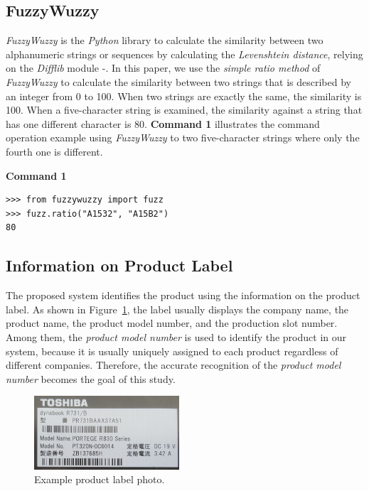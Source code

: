 \documentclass[technicalreport]{ieicej}
\begin{document}
    \subsection{FuzzyWuzzy}
        {\em FuzzyWuzzy} is the {\em Python} library to calculate the similarity between two alphanumeric strings or sequences by calculating the {\em Levenshtein distance}, relying on the {\em Difflib} module \cite{fuzzywuzzy}-\cite{fuzzywuzzy-git}. In this paper, we use the {\em simple ratio method} of {\em FuzzyWuzzy} to calculate the similarity between two strings that is described by an integer from 0 to 100. When two strings are exactly the same, the similarity is 100. When a five-character string is examined, the similarity against a string that has one different character is $80$. {\bf Command 1} illustrates the command operation example using {\em FuzzyWuzzy} to two five-character strings where only the fourth one is different.
     
        \begin{center}\bf Command 1\end{center}
        \begin{lstlisting}
>>> from fuzzywuzzy import fuzz
>>> fuzz.ratio("A1532", "A15B2")
80      \end{lstlisting}

    \subsection{Information on Product Label}
        The proposed system identifies the product using the information on the product label. As shown in Figure~\ref{fig:label-exp}, the label usually displays the company name, the product name, the product model number, and the production slot number. Among them, the {\em product model number} is used to identify the product in our system, because it is usually uniquely assigned to each product regardless of different companies. Therefore, the accurate recognition of the {\em product model number} becomes the goal of this study.

        \begin{figure}[t] 
            \begin{center}
            \includegraphics[width=0.48\textwidth]{figure/label-exp.png}
            \end{center}
            \caption{Example product label photo.}
            \label{fig:label-exp}
        \end{figure}
\end{document}
